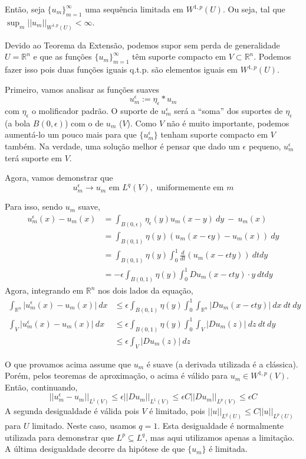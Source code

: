 \documentclass[11pt]{article}
\newcommand{\Rn}{{\mathbb{R}^n}}
\newcommand{\rn}{{\mathbb{R}^n}}
\newcommand{\e}{\epsilon}
\begin{document}
Então, seja $\{u_m\}_{m=1}^\infty$ uma sequência limitada em $W^{1,p}(U)$. Ou seja, tal que $\sup_m ||u_m||_{W^{1,p}(U)} < \infty$.

Devido ao Teorema da Extensão, podemos supor sem perda de generalidade $U=\Rn$ e que as funções $\{u_m\}_{m=1}^\infty$ têm suporte compacto em $V \subset \Rn$. Podemos fazer isso pois duas funções iguais q.t.p. são elementos iguais em $W^{1,p}(U)$.

Primeiro, vamos analisar as funções suaves \[ u_m^\e := \eta_\e * u_m \] com $ \eta_\e $ o molificador padrão.  O suporte de $u_m^\e$ será a ``soma'' dos suportes de $\eta_\e$ (a bola $B(0,\e)$) com o de $u_m$ ($V$). Como $V$ não é muito importante, podemos aumentá-lo um pouco mais para que $\{u_m^\e\}$ tenham suporte compacto em $V$ também. Na verdade, uma solução melhor é pensar que dado um $\e$ pequeno, $u_m^\e$ terá suporte em $V$.

Agora, vamos demonstrar que \[ u_m^\e \rightarrow u_m \text{ em } L^q(V), \text{ uniformemente em } m\]

Para isso, sendo $u_m$ suave, \begin{align*}
	u_m^\e(x) - u_m(x) &= \int_{B(0,\e)} \eta_\e(y)u_m(x-y)\ dy\  -\  u_m(x)\\
	&= \int_{B(0,1)} \eta(y)\left(u_m(x-\e y) - u_m(x)\right)\ dy\\
	&=  \int_{B(0,1)} \eta(y) \int_0^1 \frac{d}{dt} (u_m(x-\e t y))\ dtdy \\
	&=  -\e \int_{B(0,1)} \eta(y) \int_0^1 Du_m(x - \e t y)\cdot y\ dtdy
\end{align*}
Agora, integrando em $\rn$ nos dois lados da equação, \begin{align*}
	\int_\Rn |	u_m^\e(x) - u_m(x) |\ dx &\leq \e  \int_{B(0,1)} \eta(y) \int_0^1 \int_\Rn  |Du_m(x - \e t y)|\ dx\ dt\ dy\\
	\int_V |	u_m^\e(x) - u_m(x) |\ dx &\leq \e  \int_{B(0,1)} \eta(y) \int_0^1 \int_V  |Du_m(z)|\ dz\ dt\ dy\\
	&\leq \e \int_V |Du_m(z)| \ dz
\end{align*}

O que provamos acima assume que $u_m$ é suave (a derivada utilizada
 é a clássica). Porém, pelos teoremas de aproximação, o acima é válido para $u_m \in W^{1,p}(V)$. Então, continuando,\[ 
	||u_m^\e - u_m||_{L^1(V)} \leq \e ||Du_m||_{L^1(V)} \leq \e C ||Du_m||_{L^p(V)} \leq \e C \]
A segunda desigualdade é válida pois $V$ é limitado, pois $||u||_{L^q(U)} \leq C ||u||_{L^p(U)}$ para $U$ limitado. Neste caso, usamos $q=1$. Esta desigualdade é normalmente utilizada para demonstrar que $L^p \subseteq L^q$, mas aqui utilizamos apenas a limitação. A última desigualdade decorre da hipótese de que $\{u_m\}$ é limitada.
\end{document}
